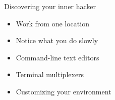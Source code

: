 \begin{frame}{Discovering your inner hacker}
    \stretchon
\begin{itemize}
    \item Work from one location
    \item Notice what you do slowly
    \item Command-line text editors
    \item Terminal multiplexers
    \item Customizing your environment
\end{itemize}
\end{frame}
